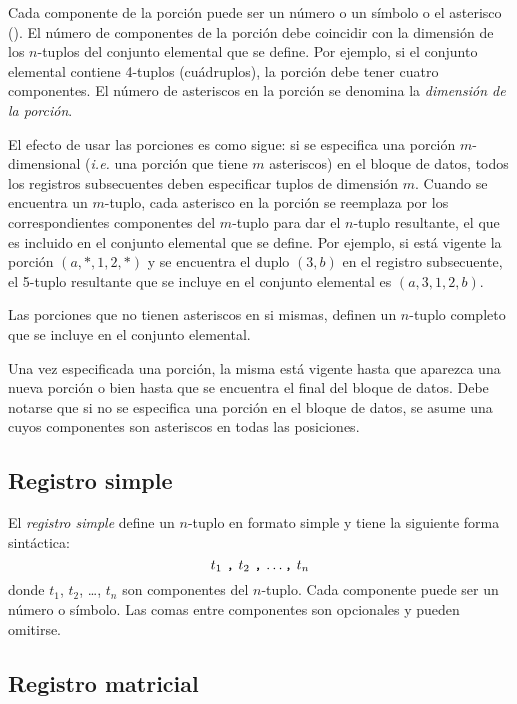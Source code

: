 \documentclass[11pt,spanish]{report}
\begin{document}
Cada componente de la porción puede ser un número o un símbolo o el asterisco ({\tt*}). El número de componentes de la porción debe coincidir con la dimensión de los $n$-tuplos del conjunto elemental que se define. Por ejemplo, si el conjunto elemental contiene 4-tuplos (cuádruplos), la porción debe tener cuatro componentes. El número de asteriscos en la porción se denomina la {\it dimensión de la porción}.

El efecto de usar las porciones es como sigue: si se especifica una porción $m$-dimensional ({\it i.e.} una porción que tiene $m$ asteriscos) en el bloque de datos, todos los registros subsecuentes deben especificar tuplos de dimensión $m$. Cuando se encuentra un $m$-tuplo, cada asterisco en la porción se reemplaza por los correspondientes componentes del $m$-tuplo para dar el $n$-tuplo resultante, el que es incluido en el conjunto elemental que se define. Por ejemplo, si está vigente la porción $(a,*,1,2,*)$ y se encuentra el duplo $(3,b)$ en el registro subsecuente, el 5-tuplo resultante que se incluye en el conjunto elemental es $(a,3,1,2,b)$.

Las porciones que no tienen asteriscos en si mismas, definen un $n$-tuplo completo que se incluye en el conjunto elemental.

Una vez especificada una porción, la misma está vigente hasta que aparezca una nueva porción o bien hasta que se encuentra el final del bloque de datos. Debe notarse que si no se especifica una porción en el bloque de datos, se asume una cuyos componentes son asteriscos en todas las posiciones.

\subsection{Registro simple}

El {\it registro simple} define un $n$-tuplo en formato simple y tiene la siguiente forma sintáctica:
$$\mbox{$t_1$ {\tt,} $t_2$ {\tt,} \dots {\tt,} $t_n$}$$
donde $t_1$, $t_2$, \dots, $t_n$ son componentes del $n$-tuplo. Cada componente puede ser un número o símbolo. Las comas entre componentes son opcionales y pueden omitirse.

\subsection{Registro matricial}
\end{document}
